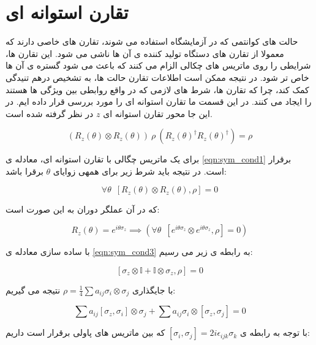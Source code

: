 \section{تقارن استوانه ای}

حالت های کوانتمی که در آزمایشگاه استفاده می شوند،‌ تقارن های خاصی دارند که معمولا از تقارن های دستگاه تولید کننده ی آن ها ناشی می شود.
این تقارن ها، شرایطی را روی ماتریس های چکالی الزام می کنند که باعث می شود گستره ی آن ها خاص تر شود. در نتیجه ممکن است اطلاعات تقارن حالت ها، به تشخیص درهم تنیدگی کمک کند،  چرا که تقارن ها، شرط های لازمی که در واقع روابطی بین ویژگی ها هستند را ایجاد می کنند.
در این قسمت ما تقارن استوانه ای را مورد بررسی قرار داده ایم. در این جا محور تقارن استوانه ای
$z$
در نظر گرفته شده است.

\begin{equation}\label{eqn:sym_cond1}
(R_z(\theta) \otimes R_z(\theta))\> \rho\> (R_z(\theta)^\dag R_z(\theta)^\dag) = \rho
\end{equation}

برای یک ماتریس چگالی با تقارن استوانه ای، معادله ی
\ref{eqn:sym_cond1}
برقرار است. در نتیجه باید شرط زیر برای همهی زوایای
$\theta$
برقرا باشد:

\begin{equation}\label{eqn:sym_cond2}
    \forall \theta \enspace [R_z(\theta)\otimes R_z(\theta) , \rho] = 0
\end{equation}

که در آن عملگر دوران به این صورت است:

\begin{equation}\label{eqn:sym_cond3}
R_z(\theta) = e^{i\theta\sigma_z} \implies (\forall \theta \enspace [e^{i\theta\sigma_z}\otimes e^{i\theta\sigma_z} , \rho] = 0)
\end{equation}

با ساده سازی معادله ی
\ref{eqn:sym_cond3}
به رابطه ی زیر می رسیم:

\begin{equation}\label{eqn:sym_cond4}
[\sigma_z\otimes \mathbb{I} + \mathbb{I}\otimes \sigma_z , \rho] = 0
\end{equation}


با جایگذاری
$\rho = \frac{1}{4}\sum a_{ij} \sigma_i \otimes \sigma_j$
نتیجه می گیریم:

\begin{equation}
\sum a_{ij} [\sigma_z,\sigma_i]\otimes \sigma_j + \sum a_{ij} \sigma_i \otimes [\sigma_z,\sigma_j]=0
\end{equation}


با توجه به رابطه ی
$[\sigma_i,\sigma_j] = 2i\epsilon_{ijk} \sigma_k$
که بین ماتریس های پاولی برقرار است  داریم:



